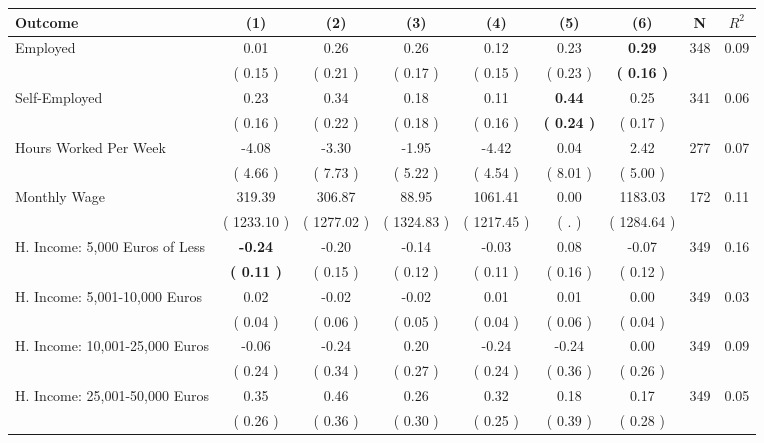 \begin{tabular}{lcccccccc}
\toprule
 \textbf{Outcome} & \textbf{(1)} & \textbf{(2)} & \textbf{(3)} & \textbf{(4)} & \textbf{(5)} & \textbf{(6)} & \textbf{N} & \textbf{$ R^2$} \\
\midrule
Employed &      0.01 &      0.26 &      0.26 &      0.12 &      0.23 & \textbf{     0.29} & 348 &       0.09 \\ 
 & (     0.15 ) & (     0.21 ) & (     0.17 ) & (     0.15 ) & (     0.23 ) & \textbf{(     0.16 )} & \\
Self-Employed &      0.23 &      0.34 &      0.18 &      0.11 & \textbf{     0.44} &      0.25 & 341 &       0.06 \\ 
 & (     0.16 ) & (     0.22 ) & (     0.18 ) & (     0.16 ) & \textbf{(     0.24 )} & (     0.17 ) & \\
Hours Worked Per Week &     -4.08 &     -3.30 &     -1.95 &     -4.42 &      0.04 &      2.42 & 277 &       0.07 \\ 
 & (     4.66 ) & (     7.73 ) & (     5.22 ) & (     4.54 ) & (     8.01 ) & (     5.00 ) & \\
Monthly Wage &    319.39 &    306.87 &     88.95 &   1061.41 &      0.00 &   1183.03 & 172 &       0.11 \\ 
 & (  1233.10 ) & (  1277.02 ) & (  1324.83 ) & (  1217.45 ) & (        . ) & (  1284.64 ) & \\
H. Income: 5,000 Euros of Less & \textbf{    -0.24} &     -0.20 &     -0.14 &     -0.03 &      0.08 &     -0.07 & 349 &       0.16 \\ 
 & \textbf{(     0.11 )} & (     0.15 ) & (     0.12 ) & (     0.11 ) & (     0.16 ) & (     0.12 ) & \\
H. Income: 5,001-10,000 Euros &      0.02 &     -0.02 &     -0.02 &      0.01 &      0.01 &      0.00 & 349 &       0.03 \\ 
 & (     0.04 ) & (     0.06 ) & (     0.05 ) & (     0.04 ) & (     0.06 ) & (     0.04 ) & \\
H. Income: 10,001-25,000 Euros &     -0.06 &     -0.24 &      0.20 &     -0.24 &     -0.24 &      0.00 & 349 &       0.09 \\ 
 & (     0.24 ) & (     0.34 ) & (     0.27 ) & (     0.24 ) & (     0.36 ) & (     0.26 ) & \\
H. Income: 25,001-50,000 Euros &      0.35 &      0.46 &      0.26 &      0.32 &      0.18 &      0.17 & 349 &       0.05 \\ 
 & (     0.26 ) & (     0.36 ) & (     0.30 ) & (     0.25 ) & (     0.39 ) & (     0.28 ) & \\

\end{tabular}
